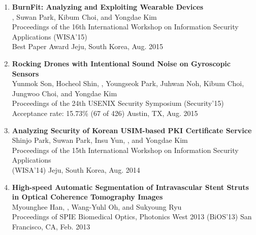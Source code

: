 \begin{enumerate}[leftmargin=1.5em]
    \item \textbf{BurnFit: Analyzing and Exploiting Wearable Devices} \\
        {\small
            , Suwan Park, Kibum Choi, and Yongdae Kim \\
            Proceedings of the 16th International Workshop on Information Security Applications (WISA'15) \\
            Best Paper Award
        }
        \hfill {\small Jeju, South Korea, Aug. 2015}

    \item \textbf{Rocking Drones with Intentional Sound Noise on Gyroscopic Sensors} \\
        {\small
            Yunmok Son, Hocheol Shin, , Youngseok Park, Juhwan Noh, Kibum Choi, Jungwoo Choi, and Yongdae Kim \\
            Proceedings of the 24th USENIX Security Symposium (Security'15) \\
            Acceptance rate: 15.73\% (67 of 426)
        }
        \hfill {\small Austin, TX, Aug. 2015}

    \item \textbf{Analyzing Security of Korean USIM-based PKI Certificate Service} \\
        {\small
            Shinjo Park, Suwan Park, Insu Yun, , and Yongdae Kim \\
            Proceedings of the 15th International Workshop on Information Security Applications \\ (WISA'14)
        }
        \hfill {\small Jeju, South Korea, Aug. 2014}

    \item \textbf{High-speed Automatic Segmentation of Intravascular Stent Struts in Optical Coherence Tomography Images} \\
        {\small
            Myounghee Han, , Wang-Yuhl Oh, and Sukyoung Ryu \\
            Proceedings of SPIE Biomedical Optics, Photonics West 2013 (BiOS'13)
        }
        \hfill {\small San Francisco, CA, Feb. 2013}
\end{enumerate}


